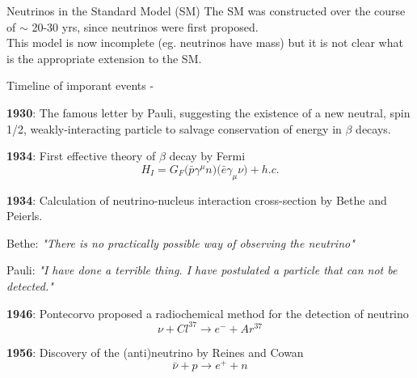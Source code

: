 \begin{frame}{Neutrinos in the Standard Model (SM)}
  \vspace{0.4cm}
  {\scriptsize
  The SM was constructed over the course
  of $\sim$ 20-30 yrs, since neutrinos were first proposed.\\
  \vspace{0.1cm}
  This model is now incomplete (eg. neutrinos have mass)
  but it is not clear what is the appropriate extension to the SM.
  }

\end{frame}

%
%
%

\begin{frame}[t,allowframebreaks]{Timeline of imporant events - }

\begin{itemize}
{\scriptsize

\item {\bf 1930}: The famous letter by Pauli, suggesting the existence
 of a new neutral, spin 1/2, weakly-interacting particle to salvage conservation
 of energy in $\beta$ decays.

\item {\bf 1934}: First effective theory of $\beta$ decay by Fermi
\begin{equation*}
  H_I = G_F \Big(\bar{p} \gamma^{\mu} n \Big) \Big(\bar{e} \gamma_{\mu} \nu \Big) + h.c.
\end{equation*}

\item {\bf 1934}: Calculation of neutrino-nucleus interaction cross-section
  by Bethe and Peierls.
  \begin{itemize}
  {\scriptsize
      \item Bethe: {\it "There is no practically possible way of observing the neutrino"}
      \item Pauli: {\it "I have done a terrible thing. I have postulated a particle that can not be detected."}
  }
  \end{itemize}

 \item {\bf 1946}: Pontecorvo proposed a radiochemical method for the detection of neutrino
 \begin{equation*}
   \nu + Cl^{37} \rightarrow e^{-} + Ar^{37}
 \end{equation*}

 \item {\bf 1956}: Discovery of the (anti)neutrino by Reines and Cowan
 \begin{equation*}
   \bar{\nu} + p \rightarrow e^{+} + n
 \end{equation*}

}
\end{itemize}
\end{frame}
